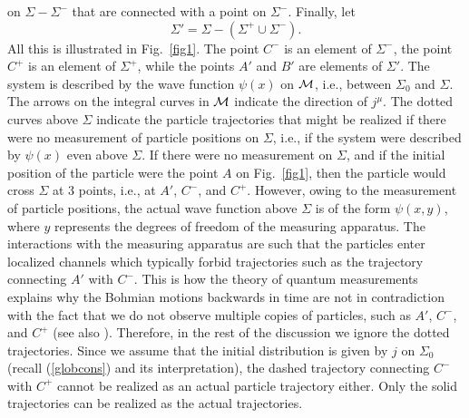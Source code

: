 \documentclass[11pt]{article}
\begin{document}
on $\Sigma-\Sigma^-$ that are connected with a point on $\Sigma^-$. 
Finally, let 
\begin{equation}
\Sigma'=\Sigma -(\Sigma^+\cup\Sigma^-) .
\end{equation}
All this is illustrated in Fig.~\ref{fig1}. 
The point $C^-$ is an element of $\Sigma^-$, the point
$C^+$ is an element of $\Sigma^+$, while the points
$A'$ and $B'$ are elements of $\Sigma'$.
The system is described by the wave function $\psi(x)$ 
on ${\cal M}$, 
i.e., between $\Sigma_0$ and $\Sigma$.
The arrows on the 
integral curves in ${\cal M}$ indicate the direction of $j^{\mu}$. 
The dotted curves above $\Sigma$ indicate the particle trajectories 
that might be realized if there were no measurement of particle 
positions on $\Sigma$, i.e., if the system were described by $\psi(x)$ 
even above 
$\Sigma$. If there were no measurement on $\Sigma$, and if the 
initial position of the particle were the point $A$ on Fig.~\ref{fig1}, 
then 
the particle would cross $\Sigma$ at 3 points, i.e., at $A'$, $C^-$, and 
$C^+$. However, owing to the measurement of particle positions, 
the actual wave function above $\Sigma$ is of the form $\psi(x,y)$, 
where $y$ represents the degrees of freedom of the measuring apparatus.
The interactions with the measuring apparatus 
are such that the particles enter localized channels
\cite{bohm,bohmPR1,holbook,nikoldbb1} which typically forbid 
trajectories such as the trajectory connecting $A'$ with $C^-$. This is how 
the theory of quantum measurements explains why the 
Bohmian motions backwards 
in time are not in contradiction with the fact that we do not observe 
multiple copies of particles, such as $A'$, $C^-$, and $C^+$ (see also
\cite{nikoldbb1}). Therefore, in the 
rest of the discussion we ignore the dotted trajectories.
Since we assume 
that the initial distribution is given by $j$ on $\Sigma_0$
(recall (\ref{globcons}) and its interpretation),
the dashed trajectory connecting $C^-$ with $C^+$ 
cannot be realized as an actual particle trajectory either. Only 
the solid trajectories can be realized as the actual trajectories.  
\end{document}
